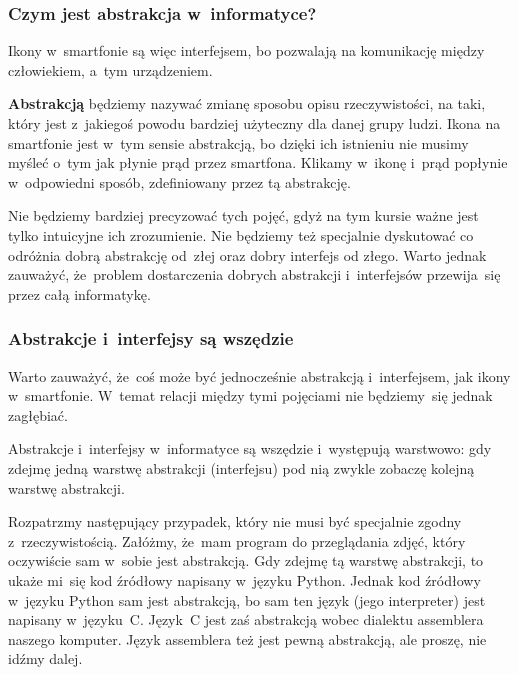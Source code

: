 \documentclass[10pt,t]{beamer}
\begin{document}
\begin{frame}
  \frametitle{Czym jest abstrakcja w~informatyce?}


  Ikony w~smartfonie są więc interfejsem, bo pozwalają na komunikację
  między człowiekiem, a~tym urządzeniem.

  \textbf{Abstrakcją} będziemy nazywać zmianę sposobu opisu rzeczywistości,
  na taki, który jest z~jakiegoś powodu bardziej użyteczny dla danej grupy
  ludzi. Ikona na smartfonie jest w~tym sensie abstrakcją, bo dzięki ich
  istnieniu nie musimy myśleć o~tym jak płynie prąd przez smartfona.
  Klikamy w~ikonę i~prąd popłynie w~odpowiedni sposób, zdefiniowany przez
  tą abstrakcję.

  Nie będziemy bardziej precyzować tych pojęć, gdyż na tym kursie ważne
  jest tylko intuicyjne ich zrozumienie. Nie będziemy też
  specjalnie dyskutować co odróżnia dobrą abstrakcję od~złej oraz dobry
  interfejs od złego. Warto jednak zauważyć, że~problem dostarczenia
  dobrych abstrakcji i~interfejsów przewija~się przez całą informatykę.

\end{frame}





\begin{frame}
  \frametitle{Abstrakcje i~interfejsy są wszędzie}


  Warto zauważyć, że~coś może być jednocześnie abstrakcją i~interfejsem,
  jak ikony w~smartfonie. W~temat relacji między tymi pojęciami nie
  będziemy~się jednak zagłębiać.

  Abstrakcje i~interfejsy w~informatyce są wszędzie i~występują warstwowo:
  gdy zdejmę jedną warstwę abstrakcji (interfejsu) pod nią zwykle zobaczę
  kolejną warstwę abstrakcji.

  Rozpatrzmy następujący przypadek, który nie musi być specjalnie zgodny
  z~rzeczywistością. Załóżmy, że~mam program do przeglądania zdjęć, który
  oczywiście sam w~sobie jest abstrakcją. Gdy zdejmę tą warstwę abstrakcji,
  to ukaże mi~się kod źródłowy napisany w~języku Python. Jednak kod
  źródłowy w~języku Python sam jest \alert{abstrakcją}, bo sam ten język
  (jego interpreter) jest napisany w~języku~C. Język~C jest zaś abstrakcją
  wobec dialektu assemblera naszego komputer. Język assemblera też jest
  pewną abstrakcją, ale proszę, nie idźmy dalej.

\end{frame}
\end{document}
